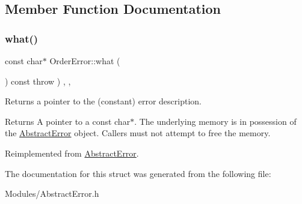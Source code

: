 \subsection{Member Function Documentation}
\mbox{\label{structOrderError_a55140961b8a995ff9111a275cac708c8}} 
\subsubsection{\texorpdfstring{what()}{what()}}
{\footnotesize\ttfamily const char$\ast$ Order\+Error\+::what (\begin{DoxyParamCaption}{ }\end{DoxyParamCaption}) const throw  ) \hspace{0.3cm}{\ttfamily [inline]}, {\ttfamily [override]}, {\ttfamily [virtual]}}

Returns a pointer to the (constant) error description. \begin{DoxyReturn}{Returns}
A pointer to a const char$\ast$. The underlying memory is in possession of the \hyperlink{classAbstractError}{Abstract\+Error} object. Callers must not attempt to free the memory. 
\end{DoxyReturn}


Reimplemented from \hyperlink{classAbstractError_a19735c7a9b5f6e84db606292967667a9}{Abstract\+Error}.



The documentation for this struct was generated from the following file\+:\begin{DoxyCompactItemize}
\item 
Modules/Abstract\+Error.\+h\end{DoxyCompactItemize}
